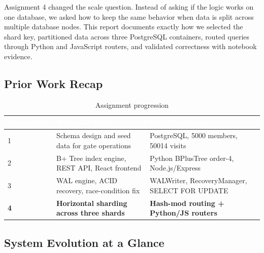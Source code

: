 \documentclass[a4paper,12pt]{article}
\newcommand{\tablehead}[1]{\textcolor{white}{\textbf{#1}}}
\begin{document}
Assignment 4 changed the scale question. Instead of asking if the logic works on one database, we asked how to keep the same behavior when data is split across multiple database nodes. This report documents exactly how we selected the shard key, partitioned data across three PostgreSQL containers, routed queries through Python and JavaScript routers, and validated correctness with notebook evidence.

\subsection{Prior Work Recap}

\begin{table}[H]
\centering
\caption{Assignment progression}
\begin{tcolorbox}[tableframe,width=\textwidth,box align=center]
\scriptsize
{}
\begin{tabularx}{\textwidth}{L{1.5cm} Y L{5.0cm}}
\toprule
{}
\tablehead{Assignment} & \tablehead{What We Built} & \tablehead{Key Technology} \\
 & Schema design and seed data for gate operations & PostgreSQL, 5000 members, 50014 visits \\
2 & B+ Tree index engine, REST API, React frontend & Python BPlusTree order-4, Node.js/Express \\
3 & WAL engine, ACID recovery, race-condition fix & WALWriter, RecoveryManager, SELECT FOR UPDATE \\
\textbf{4} & \textbf{Horizontal sharding across three shards} & \textbf{Hash-mod routing + Python/JS routers} \\
\bottomrule
\end{tabularx}
\end{tcolorbox}
\end{table}

\subsection{System Evolution at a Glance}
\end{document}

